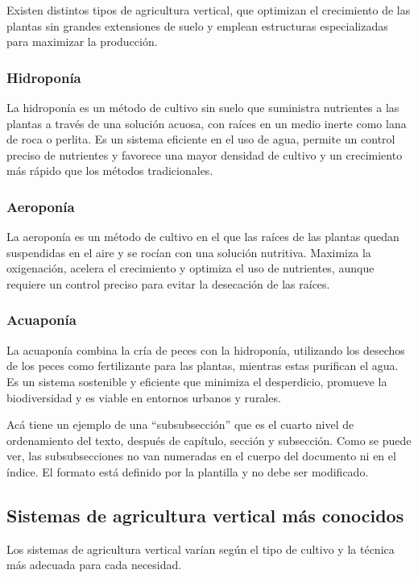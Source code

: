 
Existen distintos tipos de agricultura vertical, que optimizan el crecimiento de las plantas sin grandes extensiones de suelo y emplean estructuras especializadas para maximizar la producción.

\subsubsection{Hidroponía}
La hidroponía es un método de cultivo sin suelo que suministra nutrientes a las plantas a través de una solución acuosa, con raíces en un medio inerte como lana de roca o perlita. Es un sistema eficiente en el uso de agua, permite un control preciso de nutrientes y favorece una mayor densidad de cultivo y un crecimiento más rápido que los métodos tradicionales.
\subsubsection{Aeroponía}
La aeroponía es un método de cultivo en el que las raíces de las plantas quedan suspendidas en el aire y se rocían con una solución nutritiva. Maximiza la oxigenación, acelera el crecimiento y optimiza el uso de nutrientes, aunque requiere un control preciso para evitar la desecación de las raíces.
\subsubsection{Acuaponía}
La acuaponía combina la cría de peces con la hidroponía, utilizando los desechos de los peces como fertilizante para las plantas, mientras estas purifican el agua. Es un sistema sostenible y eficiente que minimiza el desperdicio, promueve la biodiversidad y es viable en entornos urbanos y rurales.

Acá tiene un ejemplo de una ``subsubsección'' que es el cuarto nivel de ordenamiento del texto, después de capítulo, sección y subsección.  Como se puede ver, las subsubsecciones no van numeradas en el cuerpo del documento ni en el índice.  El formato está definido por la plantilla y no debe ser modificado.

\subsection{Sistemas de agricultura vertical más conocidos}
Los sistemas de agricultura vertical varían según el tipo de cultivo y la técnica más adecuada para cada necesidad.

